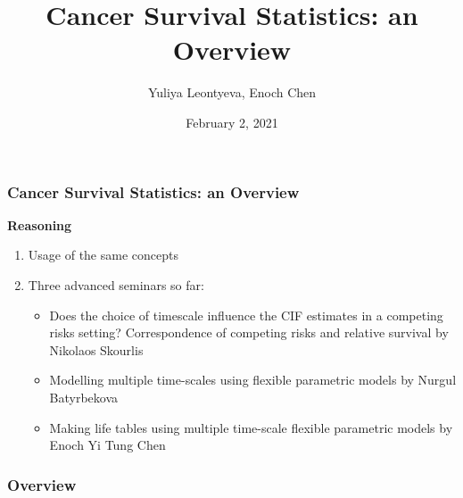 \documentclass{beamer}
\title[overview]{Cancer Survival Statistics: an Overview} %
\author{Yuliya Leontyeva, Enoch Chen} %
\institute[MEB] %
{
MEB, KI Stockholm \\ %
\medskip
}
\date{February 2, 2021} %
\begin{document}
\begin{frame}
\titlepage %
\end{frame}

\begin{frame}
\frametitle{Cancer Survival Statistics: an Overview} %
\textbf{Reasoning}

\begin{enumerate}
    \item Usage of the same concepts
    \item Three advanced seminars so far:
    \begin{itemize}
        \item Does the choice of timescale influence the CIF estimates in a competing risks setting? Correspondence of competing risks and relative survival by Nikolaos Skourlis
        \item Modelling multiple time-scales using flexible parametric models by Nurgul Batyrbekova
        \item Making life tables using multiple time-scale flexible parametric models by Enoch Yi Tung Chen
    \end{itemize}
\end{enumerate}
\end{frame}






\begin{frame}
\frametitle{Overview} %
\tableofcontents %
\end{frame}

\end{document}
